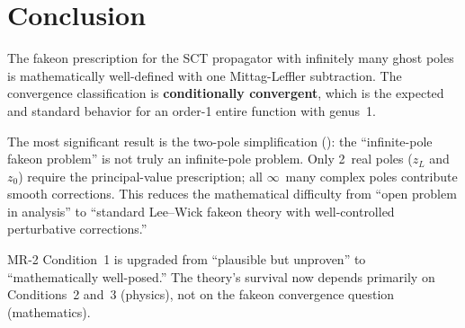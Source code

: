 \documentclass[11pt,a4paper]{article}
\begin{document}
\section{Conclusion}
\label{sec:conclusion}

The fakeon prescription for the SCT propagator with infinitely many
ghost poles is mathematically well-defined with one Mittag-Leffler
subtraction.  The convergence classification is
\textbf{conditionally convergent}, which is the expected and standard
behavior for an order-1 entire function with genus~1.

The most significant result is the two-pole simplification
(): the ``infinite-pole fakeon problem'' is not
truly an infinite-pole problem.  Only 2~real poles ($z_L$ and $z_0$)
require the principal-value prescription; all $\infty$~many complex
poles contribute smooth corrections.  This reduces the mathematical
difficulty from ``open problem in analysis'' to ``standard Lee--Wick
fakeon theory with well-controlled perturbative corrections.''

MR-2 Condition~1 is upgraded from ``plausible but unproven'' to
``mathematically well-posed.''  The theory's survival now depends
primarily on Conditions~2 and~3 (physics), not on the fakeon
convergence question (mathematics).
\end{document}

